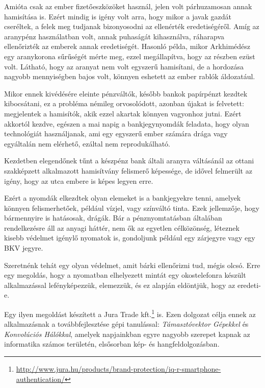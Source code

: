 Amióta csak az ember fizetőeszközöket használ, jelen volt párhuzamosan annak hamisítása is.
Ezért mindig is igény volt arra, hogy mikor a javak gazdát cseréltek, a felek meg tudjanak 
bizonyosodni az ellenérték eredetiségéről. Amíg az aranypénz használatban volt, annak puhaságát 
kihasználva, ráharapva ellenőrizték az emberek annak eredetiségét. Hasonló példa, 
mikor Arkhimédész egy aranykorona sűrűségét mérte meg, ezzel megállapítva, hogy az részben ezüst
volt. Látható, hogy az aranyat nem volt egyszerű hamisítani, de a hordozása nagyobb 
mennyiségben bajos volt, könnyen eshetett az ember rablók áldozatául.

Mikor ennek kivédésére eleinte pénzváltók, később bankok papírpénzt kezdtek kibocsátani, ez a probléma némileg orvosolódott,
azonban újakat is felvetett: megjelentek a hamisítók, akik ezzel akartak könnyen vagyonhoz jutni.
Ezért akkortól kezdve, egészen a mai napig a bankjegynyomdák feladata, hogy olyan
technológiát használjanak, ami egy egyszerű ember számára drága vagy egyáltalán nem elérhető,
ezáltal nem reprodukálható.

Kezdetben elegendőnek tűnt a készpénz bank általi aranyra váltásánál az ottani szakképzett 
alkalmazott hamisítvány felismerő képessége,  de idővel felmerült az igény, hogy az utca embere
is képes legyen erre.

Ezért a nyomdák elkezdtek olyan elemeket is a bankjegyekre tenni, amelyek könnyen felismerhetőek,
például vízjel, vagy színváltó tinta. Ezek jellemzője, hogy bármennyire is hatásosak, drágák.
Bár a pénznyomtatásban általában rendelkezésre áll az anyagi háttér, nem ők az egyetlen
célközönség, léteznek kisebb védelmet igénylő nyomatok is, gondoljunk például egy 
zárjegyre vagy egy BKV jegyre.

Szeretnénk tehát egy olyan védelmet, amit bárki ellenőrizni tud, mégis olcsó. Erre egy megoldás,
hogy a nyomatban elhelyezett mintát egy okostelefonra készült alkalmazással lefényképezzük,
elemezzük, és ez alapján eldöntjük, hogy az eredeti-e.


Egy ilyen megoldást készített a Jura Trade kft.\footnote{\url{http://www.jura.hu/products/brand-protection/iq-r-smartphone-authentication/}} \cite{okostelefonnal} is. Ezen dolgozat célja ennek az alkalmazásnak
a továbbfejlesztése gépi tanulással: \textit{Támasztóvektor Gépekkel} és \textit{Konvolúciós Hálókkal},
amelyek napjainkban egyre nagyobb szerepet kapnak az informatika számos területén, elsősorban kép- és hangfeldolgozásban. 

